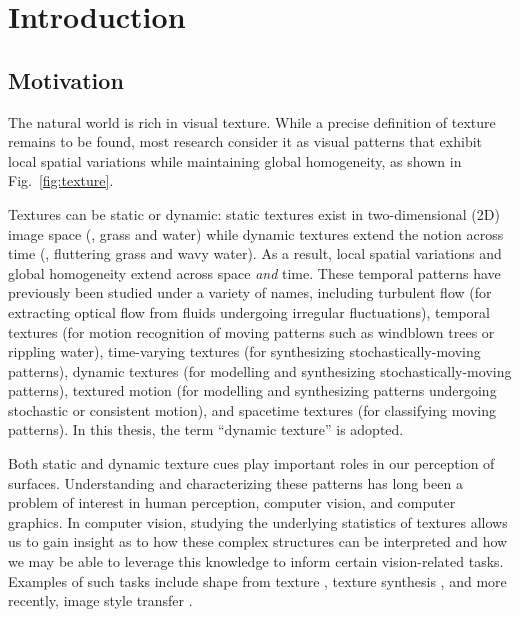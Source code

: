 \chapter{Introduction}

\section{Motivation}

The natural world is rich in visual texture. While a precise definition of 
texture remains to be found, most research consider it as visual patterns that 
exhibit local spatial variations while maintaining global homogeneity, as shown in Fig.\ \ref{fig:texture}.



Textures 
can be static or dynamic: static textures exist in two-dimensional (2D) image space 
(\eg, grass and water) while dynamic textures extend the notion across time (\eg, 
fluttering grass and wavy water). As a result, local spatial variations and 
global homogeneity extend across space \emph{and} time. These temporal patterns 
have previously been studied under a variety of names, including turbulent flow \cite{heeger1986} (for extracting optical flow from fluids undergoing irregular fluctuations), temporal textures \cite{nelson1992} (for motion recognition of moving patterns such as windblown trees or rippling water), time-varying 
textures \cite{bar-joseph2001} (for synthesizing stochastically-moving patterns), dynamic textures \cite{doretto2003} (for modelling and synthesizing stochastically-moving patterns), textured 
motion \cite{wang2003} (for modelling and synthesizing patterns undergoing stochastic or consistent motion), and spacetime textures \cite{derpanis2012spacetime} (for classifying moving patterns).
In this thesis, the term ``dynamic texture'' is adopted.

Both static and dynamic texture cues play important roles in our perception of 
surfaces. Understanding and characterizing these patterns has long been a problem 
of interest in human perception, computer vision, and computer graphics. In 
computer vision, studying the underlying statistics of textures allows us to gain 
insight as to how these complex structures can be interpreted and how we may be 
able to leverage this knowledge to inform certain vision-related tasks. Examples 
of such tasks include shape from texture \cite{gibson1950perception}, texture 
synthesis \cite{heeger1995pyramid}, and more recently, image style transfer 
\cite{gatys2016image}.

